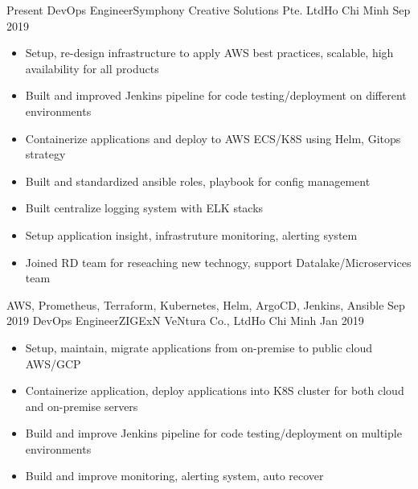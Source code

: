 %
%
%
\begin{experiences}
  \experience
    {Present}   {DevOps Engineer}{Symphony Creative Solutions Pte. Ltd}{Ho Chi Minh}
    {Sep 2019}  {
                      \begin{itemize}
                        \item Setup, re-design infrastructure to apply AWS best practices, scalable, high availability for all products                      
                        \item Built and improved Jenkins pipeline for code testing/deployment on different environments                   
                        \item Containerize applications and deploy to AWS ECS/K8S using Helm, Gitops strategy
                        \item Built and standardized ansible roles, playbook for config management
                        \item Built centralize logging system with ELK stacks
                        \item Setup application insight, infrastruture monitoring, alerting system
                        \item Joined RD team for reseaching new technogy, support Datalake/Microservices team
                      \end{itemize}
                    }
                    {AWS, Prometheus, Terraform, Kubernetes, Helm, ArgoCD, Jenkins, Ansible}
  \emptySeparator
  \experience
    {Sep 2019} {DevOps Engineer}{ZIGExN VeNtura Co., Ltd}{Ho Chi Minh}
    {Jan 2019}    {
                      \begin{itemize}
                        \item Setup, maintain, migrate applications from on-premise to public cloud AWS/GCP
                        \item Containerize application, deploy applications into K8S cluster for both cloud and on-premise servers
                        \item Build and improve Jenkins pipeline for code testing/deployment on multiple environments
                        \item Build and improve monitoring, alerting system, auto recover

\end{itemize}}
\end{experiences}
